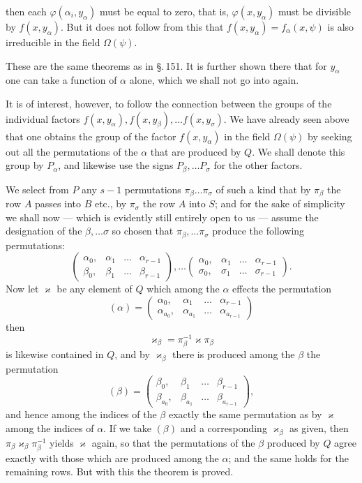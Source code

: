 then each $\varphi(\alpha_i, y_\alpha)$ must be equal to zero, that is, $\varphi(x, y_\alpha)$ must
be divisible by $f(x, y_\alpha)$. But it does not follow from this that
$f(x, y_\alpha) = f_\alpha(x, \psi)$ is also irreducible in the field $\Omega(\psi)$.

These are the same theorems as in \S.\,151. It is further shown
there that for $y_\alpha$ one can take a function of $\alpha$ alone,
which we shall not go into again.

It is of interest, however, to follow the connection between the 
groups of the individual factors $f(x, y_\alpha), f(x, y_\beta), \ldots f(x, y_\sigma)$.
We have already seen above that one obtains the
group of the factor $f(x, y_\alpha)$ in the field $\Omega(\psi)$ by seeking out
all the permutations of the $\alpha$ that are produced by $Q$.
We shall denote this group by $P_\alpha$, and likewise
use the signs $P_\beta, \ldots P_\sigma$ for the other factors.

We select from $P$ any $s - 1$ permutations $\pi_\beta \ldots \pi_\sigma$
of such a kind that by $\pi_\beta$ the row $A$ passes into $B$ etc.,
by $\pi_\sigma$ the row $A$ into $S$; and for the sake of
simplicity we shall now — which is evidently still entirely open to us — assume the
designation of the $\beta, \ldots \sigma$ so chosen that $\pi_\beta, \ldots \pi_\sigma$
produce the following permutations:
\[
\begin{pmatrix} \alpha_0, & \alpha_1 & \ldots & \alpha_{r-1} \\ \beta_0, & \beta_1 & \ldots & \beta_{r-1} \end{pmatrix}, \ldots
\begin{pmatrix} \alpha_0, & \alpha_1 & \ldots & \alpha_{r-1} \\ \sigma_0, & \sigma_1 & \ldots & \sigma_{r-1} \end{pmatrix}.
\]
Now let $\varkappa$ be any element of $Q$ which among the $\alpha$ effects the
permutation
\[
(\alpha) = \begin{pmatrix} \alpha_0, & \alpha_1 & \ldots & \alpha_{r-1} \\ \alpha_{a_0}, & \alpha_{a_1} & \ldots & \alpha_{a_{r-1}} \end{pmatrix}
\]
then
\[
\varkappa_\beta = \pi_\beta^{-1} \varkappa \pi_\beta
\]
is likewise contained in $Q$, and by $\varkappa_\beta$ there is produced among the $\beta$ the
permutation
\[
(\beta) = \begin{pmatrix} \beta_0, & \beta_1 & \ldots & \beta_{r-1} \\ \beta_{a_0}, & \beta_{a_1} & \ldots & \beta_{a_{r-1}} \end{pmatrix},
\]
and hence among the indices of the $\beta$ exactly the same permutation
as by $\varkappa$ among the indices of $\alpha$. If we take
$(\beta)$ and a corresponding $\varkappa_\beta$ as given, then $\pi_\beta \varkappa_\beta \pi_\beta^{-1}$
yields $\varkappa$ again, so that the permutations of the $\beta$
produced by $Q$ agree exactly with those which are produced among the
$\alpha$; and the same holds for the remaining
rows. But with this the theorem is proved.
